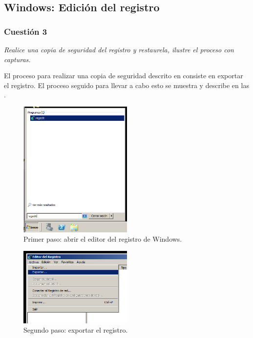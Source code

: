\subsection{Windows: Edición del registro}
\subsubsection{Cuestión 3}
\textit{Realice una copia de seguridad del registro y restaurela, ilustre el proceso con capturas.}
\newline

El proceso para realizar una copia de seguridad descrito en consiste en exportar el registro. \cite{bac} El proceso seguido para llevar a cabo esto se muestra y describe en las .
\begin{figure}[H]
  \begin{center}
    \includegraphics[width=0.5\textwidth]{imagenes/1}
    \caption{Primer paso: abrir el editor del registro de Windows.}
    \label{fig1}
  \end{center}
\end{figure}

\begin{figure}[H]
  \begin{center}
    \includegraphics[width=0.5\textwidth]{imagenes/2}
    \caption{Segundo paso: exportar el registro.}
    \label{fig2}
  \end{center}
\end{figure}

